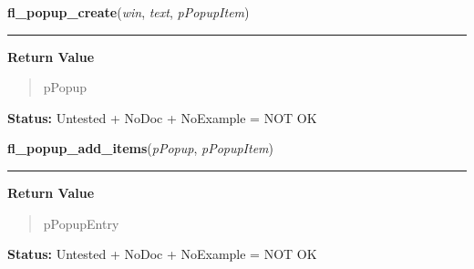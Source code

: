     \label{xformslib:library:fl_popup_create}

    \vspace{0.5ex}

\hspace{.8\funcindent}\begin{boxedminipage}{\funcwidth}

    \raggedright \textbf{fl\_popup\_create}(\textit{win}, \textit{text}, \textit{pPopupItem})

    \vspace{-1.5ex}

    \rule{\textwidth}{0.5\fboxrule}
\setlength{\parskip}{2ex}
\setlength{\parskip}{1ex}
      \textbf{Return Value}
    \vspace{-1ex}

      \begin{quote}
      pPopup

      \end{quote}

\textbf{Status:} Untested + NoDoc + NoExample = NOT OK



    \end{boxedminipage}

    \label{xformslib:library:fl_popup_add_items}

    \vspace{0.5ex}

\hspace{.8\funcindent}\begin{boxedminipage}{\funcwidth}

    \raggedright \textbf{fl\_popup\_add\_items}(\textit{pPopup}, \textit{pPopupItem})

    \vspace{-1.5ex}

    \rule{\textwidth}{0.5\fboxrule}
\setlength{\parskip}{2ex}
\setlength{\parskip}{1ex}
      \textbf{Return Value}
    \vspace{-1ex}

      \begin{quote}
      pPopupEntry

      \end{quote}

\textbf{Status:} Untested + NoDoc + NoExample = NOT OK



    \end{boxedminipage}

